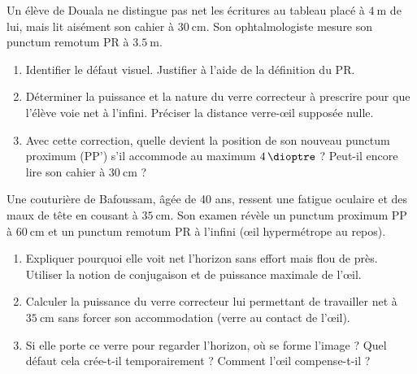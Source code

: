 \documentclass[11pt]{article}
\begin{document}
\begin{exercice}
Un élève de Douala ne distingue pas net les écritures au tableau placé à $\SI{4}{\metre}$ de lui, mais lit aisément son cahier à $\SI{30}{\centi\metre}$. Son ophtalmologiste mesure son punctum remotum PR à $\SI{3,5}{\metre}$.
\begin{enumerate}
    \item Identifier le défaut visuel. Justifier à l'aide de la définition du PR.
    \item Déterminer la puissance et la nature du verre correcteur à prescrire pour que l'élève voie net à l'infini. Préciser la distance verre-œil supposée nulle.
    \item Avec cette correction, quelle devient la position de son nouveau punctum proximum (PP') s'il accommode au maximum $\SI{4}{\dioptre}$ ? Peut-il encore lire son cahier à $\SI{30}{\centi\metre}$ ?
\end{enumerate}
\end{exercice}

\begin{exercice}
Une couturière de Bafoussam, âgée de 40 ans, ressent une fatigue oculaire et des maux de tête en cousant à $\SI{35}{\centi\metre}$. Son examen révèle un punctum proximum PP à $\SI{60}{\centi\metre}$ et un punctum remotum PR à l'infini (œil hypermétrope au repos).
\begin{enumerate}
    \item Expliquer pourquoi elle voit net l'horizon sans effort mais flou de près. Utiliser la notion de conjugaison et de puissance maximale de l'œil.
    \item Calculer la puissance du verre correcteur lui permettant de travailler net à $\SI{35}{\centi\metre}$ sans forcer son accommodation (verre au contact de l'œil).
    \item Si elle porte ce verre pour regarder l'horizon, où se forme l'image ? Quel défaut cela crée-t-il temporairement ? Comment l'œil compense-t-il ?
\end{enumerate}
\end{exercice}
\end{document}
